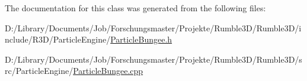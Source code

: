 The documentation for this class was generated from the following files\+:\begin{DoxyCompactItemize}
\item 
D\+:/\+Library/\+Documents/\+Job/\+Forschungsmaster/\+Projekte/\+Rumble3\+D/\+Rumble3\+D/include/\+R3\+D/\+Particle\+Engine/\mbox{\hyperlink{_particle_bungee_8h}{Particle\+Bungee.\+h}}\item 
D\+:/\+Library/\+Documents/\+Job/\+Forschungsmaster/\+Projekte/\+Rumble3\+D/\+Rumble3\+D/src/\+Particle\+Engine/\mbox{\hyperlink{_particle_bungee_8cpp}{Particle\+Bungee.\+cpp}}\end{DoxyCompactItemize}
